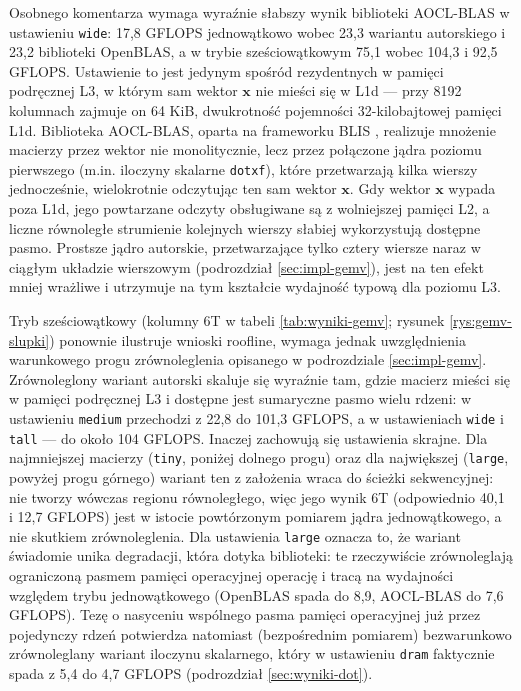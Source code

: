 \documentclass[a4paper,12pt]{book} %
\begin{document}
Osobnego komentarza wymaga wyraźnie słabszy wynik biblioteki AOCL-BLAS w ustawieniu \texttt{wide}: 17,8 GFLOPS jednowątkowo wobec 23,3 wariantu autorskiego i 23,2 biblioteki OpenBLAS, a w trybie sześciowątkowym 75,1 wobec 104,3 i 92,5 GFLOPS. Ustawienie to jest jedynym spośród rezydentnych w pamięci podręcznej L3, w którym sam wektor $\mathbf{x}$ nie mieści się w L1d --- przy 8192 kolumnach zajmuje on 64 KiB, dwukrotność pojemności 32-kilobajtowej pamięci L1d. Biblioteka AOCL-BLAS, oparta na frameworku BLIS \cite{vanzee2015blis,amd_aocl_blas}, realizuje mnożenie macierzy przez wektor nie monolitycznie, lecz przez połączone jądra poziomu pierwszego (m.in. iloczyny skalarne \texttt{dotxf}), które przetwarzają kilka wierszy jednocześnie, wielokrotnie odczytując ten sam wektor $\mathbf{x}$. Gdy wektor $\mathbf{x}$ wypada poza L1d, jego powtarzane odczyty obsługiwane są z wolniejszej pamięci L2, a liczne równoległe strumienie kolejnych wierszy słabiej wykorzystują dostępne pasmo. Prostsze jądro autorskie, przetwarzające tylko cztery wiersze naraz w ciągłym układzie wierszowym (podrozdział \ref{sec:impl-gemv}), jest na ten efekt mniej wrażliwe i utrzymuje na tym kształcie wydajność typową dla poziomu L3.

Tryb sześciowątkowy (kolumny 6T w tabeli \ref{tab:wyniki-gemv}; rysunek \ref{rys:gemv-slupki}) ponownie ilustruje wnioski roofline, wymaga jednak uwzględnienia warunkowego progu zrównoleglenia opisanego w podrozdziale \ref{sec:impl-gemv}. Zrównoleglony wariant autorski skaluje się wyraźnie tam, gdzie macierz mieści się w pamięci podręcznej L3 i dostępne jest sumaryczne pasmo wielu rdzeni: w ustawieniu \texttt{medium} przechodzi z 22,8 do 101,3 GFLOPS, a w ustawieniach \texttt{wide} i \texttt{tall} --- do około 104 GFLOPS. Inaczej zachowują się ustawienia skrajne. Dla najmniejszej macierzy (\texttt{tiny}, poniżej dolnego progu) oraz dla największej (\texttt{large}, powyżej progu górnego) wariant ten z założenia wraca do ścieżki sekwencyjnej: nie tworzy wówczas regionu równoległego, więc jego wynik 6T (odpowiednio 40,1 i 12,7 GFLOPS) jest w istocie powtórzonym pomiarem jądra jednowątkowego, a nie skutkiem zrównoleglenia. Dla ustawienia \texttt{large} oznacza to, że wariant świadomie unika degradacji, która dotyka biblioteki: te rzeczywiście zrównoleglają ograniczoną pasmem pamięci operacyjnej operację i tracą na wydajności względem trybu jednowątkowego (OpenBLAS spada do 8,9, AOCL-BLAS do 7,6 GFLOPS). Tezę o nasyceniu wspólnego pasma pamięci operacyjnej już przez pojedynczy rdzeń potwierdza natomiast (bezpośrednim pomiarem) bezwarunkowo zrównoleglany wariant iloczynu skalarnego, który w ustawieniu \texttt{dram} faktycznie spada z 5,4 do 4,7 GFLOPS (podrozdział \ref{sec:wyniki-dot}).
\end{document}
